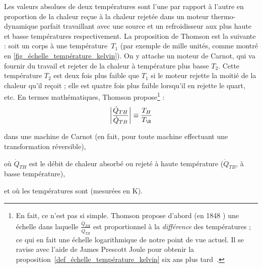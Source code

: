 			Les valeurs absolues de deux températures sont l’une par rapport à l’autre en proportion de la chaleur reçue à la chaleur rejetée dans un moteur thermo-dynamique parfait travaillant avec une source et un refroidisseur aux plus haute et basse températures respectivement.
		La proposition de Thomson est la suivante : soit un corps à une température~$T_1$ (par exemple de mille unités, comme montré en \cref{fig_échelle_température_kelvin}). On y attache un moteur de Carnot, qui va fournir du travail et rejeter de la chaleur à température plus basse $T_2$. Cette température $T_2$ est deux fois plus faible que $T_1$ si le moteur rejette la moitié de la chaleur qu’il reçoit ; elle est quatre fois plus faible lorsqu’il en rejette le quart, etc. En termes mathématiques, Thomson propose\footnote{En fait, ce n’est pas si simple. Thomson propose d’abord (en 1848 \cite{kelvin1848}) une échelle dans laquelle $\frac{\dot Q_{TH}}{\dot Q_{TB}}$ est proportionnel à la \emph{différence} des températures ; ce qui en fait une échelle logarithmique de notre point de vue actuel. Il se ravise avec l’aide de James Prescott Joule pour obtenir la proposition~\ref{def_échelle_température_kelvin} six ans plus tard~\cite{kelvinjoule1854}.} :
		\begin{equation}
			\left| \frac{\dot Q_{TH}}{\dot Q_{TB}} \right| \equiv  \frac{T_H}{T_\B }
			\label{def_échelle_température_kelvin}
		\end{equation}
		\begin{equationterms}
			\item dans une machine de Carnot (en fait, pour toute machine effectuant une transformation réversible),
			\item où \tab $\dot Q_{TH}$ \tab est le débit de chaleur absorbé ou rejeté à haute température ($\dot Q_{TB}$, à basse température),
			\item et où les températures sont  (mesurées en \si{\kelvin}).
		\end{equationterms}

